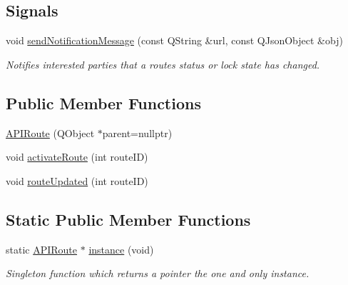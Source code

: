 \subsection*{Signals}
\begin{DoxyCompactItemize}
\item 
\mbox{\label{class_a_p_i_route_ad9db78abae10c20cbbec86378ba94db3}} 
void \hyperlink{class_a_p_i_route_ad9db78abae10c20cbbec86378ba94db3}{send\+Notification\+Message} (const Q\+String \&url, const Q\+Json\+Object \&obj)
\begin{DoxyCompactList}\small\item\em Notifies interested parties that a route\textquotesingle{}s status or lock state has changed. \end{DoxyCompactList}\end{DoxyCompactItemize}
\subsection*{Public Member Functions}
\begin{DoxyCompactItemize}
\item 
\hyperlink{class_a_p_i_route_ada8e5c770e397fc6ed6602bdbb670a29}{A\+P\+I\+Route} (Q\+Object $\ast$parent=nullptr)
\item 
void \hyperlink{class_a_p_i_route_ac110d1999b3afe409d6e341fb9ab06d6}{activate\+Route} (int route\+ID)
\item 
void \hyperlink{class_a_p_i_route_a69496cb286e280c033c115e45b43aea7}{route\+Updated} (int route\+ID)
\end{DoxyCompactItemize}
\subsection*{Static Public Member Functions}
\begin{DoxyCompactItemize}
\item 
\mbox{\label{class_a_p_i_route_af7d8f762fc9a692118fb222ab1aa89a3}} 
static \hyperlink{class_a_p_i_route}{A\+P\+I\+Route} $\ast$ \hyperlink{class_a_p_i_route_af7d8f762fc9a692118fb222ab1aa89a3}{instance} (void)
\begin{DoxyCompactList}\small\item\em Singleton function which returns a pointer the one and only instance. \end{DoxyCompactList}\end{DoxyCompactItemize}


